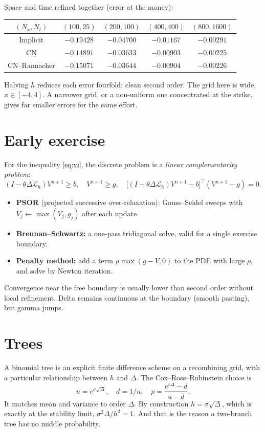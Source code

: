 \begin{numcheck}
Space and time refined together (error at the money):
\begin{center}
\begin{tabular}{ccccc}
\toprule
$(N_x,N_t)$ & $(100,25)$ & $(200,100)$ & $(400,400)$ & $(800,1600)$\\
\midrule
Implicit & $-0.19428$ & $-0.04700$ & $-0.01167$ & $-0.00291$\\
CN & $-0.14891$ & $-0.03633$ & $-0.00903$ & $-0.00225$\\
CN--Rannacher & $-0.15071$ & $-0.03644$ & $-0.00904$ & $-0.00226$\\
\bottomrule
\end{tabular}
\end{center}
Halving $h$ reduces each error fourfold: clean second order. The grid here is wide, $x\in[-4,4]$. A narrower grid, or a non-uniform one concentrated at the strike, gives far smaller errors for the same effort.
\end{numcheck}

\section{Early exercise}

For the inequality \eqref{eq:vi}, the discrete problem is a \emph{linear complementarity problem}:
\[
(I-\theta\Delta\mathcal{L}_h)V^{n+1}\ge b,\quad V^{n+1}\ge g,\quad\bigl[(I-\theta\Delta\mathcal{L}_h)V^{n+1}-b\bigr]^\top(V^{n+1}-g)=0.
\]
\begin{itemize}
\item \textbf{PSOR} (projected successive over-relaxation): Gauss--Seidel sweeps with $V_j\leftarrow\max(V_j,g_j)$ after each update.
\item \textbf{Brennan--Schwartz:} a one-pass tridiagonal solve, valid for a single exercise boundary.
\item \textbf{Penalty method:} add a term $\rho\max(g-V,0)$ to the PDE with large $\rho$, and solve by Newton iteration.
\end{itemize}
Convergence near the free boundary is usually lower than second order without local refinement. Delta remains continuous at the boundary (smooth pasting), but gamma jumps.

\section{Trees}\label{sec:trees}

A binomial tree is an explicit finite difference scheme on a recombining grid, with a particular relationship between $h$ and $\Delta$. The Cox--Ross--Rubinstein choice is
\[
u=e^{\sigma\sqrt\Delta},\quad d=1/u,\quad p=\frac{e^{r\Delta}-d}{u-d}.
\]
It matches mean and variance to order $\Delta$. By construction $h=\sigma\sqrt\Delta$, which is exactly at the stability limit, $\sigma^2\Delta/h^2=1$. And that is the reason a two-branch tree has no middle probability.

